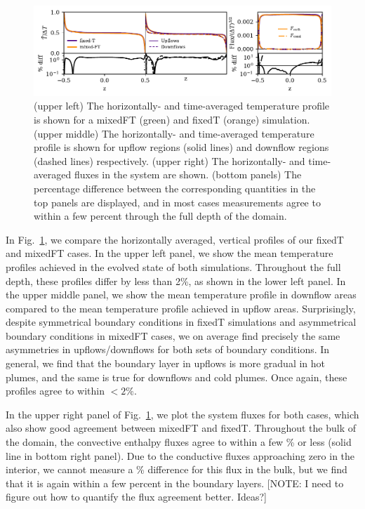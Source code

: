 \documentclass[aps, pre, onecolumn, nofootinbib, notitlepage, groupedaddress, amsfonts, amssymb, amsmath, longbibliography, superscriptaddress]{revtex4-1}
\begin{document}
\begin{figure}
\includegraphics[width=\textwidth]{./figs/rbc_1D_profiles.pdf}
\caption{ 
	(upper left) The horizontally- and time-averaged temperature profile is shown for a mixedFT (green) and fixedT (orange) simulation.
	(upper middle) The horizontally- and time-averaged temperature profile is shown for upflow regions (solid lines) and downflow regions (dashed lines) respectively.
	(upper right) The horizontally- and time-averaged fluxes in the system are shown.
	(bottom panels) The percentage difference between the corresponding quantities in the top panels are displayed, and in most cases measurements agree to within a few percent through the full depth of the domain.
\label{fig:rbc_1D_profiles} }
\end{figure}

In Fig.~\ref{fig:rbc_1D_profiles}, we compare the horizontally averaged, vertical profiles of our fixedT and mixedFT cases.
In the upper left panel, we show the mean temperature profiles achieved in the evolved state of both simulations.
Throughout the full depth, these profiles differ by less than 2\%, as shown in the lower left panel.
In the upper middle panel, we show the mean temperature profile in downflow areas compared to the mean temperature profile achieved in upflow areas.
Surprisingly, despite symmetrical boundary conditions in fixedT simulations and asymmetrical boundary conditions in mixedFT cases, we on average find precisely the same asymmetries in upflows/downflows for both sets of boundary conditions.
In general, we find that the boundary layer in upflows is more gradual in hot plumes, and the same is true for downflows and cold plumes.
Once again, these profiles agree to within $< 2\%$.

In the upper right panel of Fig.~\ref{fig:rbc_1D_profiles}, we plot the system fluxes for both cases, which also show good agreement between mixedFT and fixedT.
Throughout the bulk of the domain, the convective enthalpy fluxes agree to within a few \% or less (solid line in bottom right panel).
Due to the conductive fluxes approaching zero in the interior, we cannot measure a \% difference for this flux in the bulk, but we find that it is again within a few percent in the boundary layers.
[NOTE: I need to figure out how to quantify the flux agreement better. Ideas?]
\end{document}
